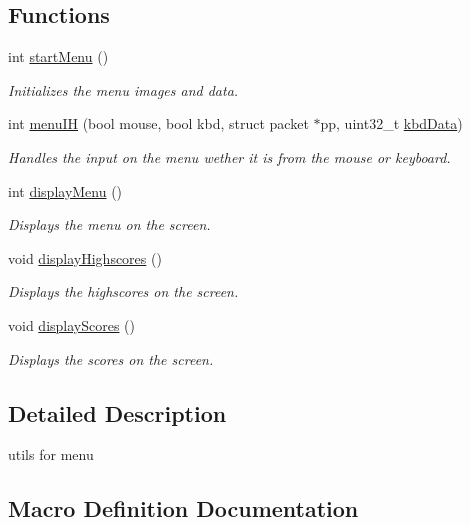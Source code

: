 \subsection*{Functions}
\begin{DoxyCompactItemize}
\item 
int \mbox{\hyperlink{group__menu_ga3bd019c071fe96105524873879e16c06}{start\+Menu}} ()
\begin{DoxyCompactList}\small\item\em Initializes the menu images and data. \end{DoxyCompactList}\item 
int \mbox{\hyperlink{group__menu_ga1c459dc7e822e8e658b11c66508d79f1}{menu\+IH}} (bool mouse, bool kbd, struct packet $\ast$pp, uint32\+\_\+t \mbox{\hyperlink{keyboard_8c_a6486f62fb206e8e9ca3ace0ba1e6efbf}{kbd\+Data}})
\begin{DoxyCompactList}\small\item\em Handles the input on the menu wether it is from the mouse or keyboard. \end{DoxyCompactList}\item 
int \mbox{\hyperlink{group__menu_gaad9ed7a055a99883645739e4bfca0e5e}{display\+Menu}} ()
\begin{DoxyCompactList}\small\item\em Displays the menu on the screen. \end{DoxyCompactList}\item 
void \mbox{\hyperlink{group__menu_ga69fa28cb0fa5f4165feb0612cd3ba98e}{display\+Highscores}} ()
\begin{DoxyCompactList}\small\item\em Displays the highscores on the screen. \end{DoxyCompactList}\item 
void \mbox{\hyperlink{group__menu_ga4e67dd36352ce9409d1994cad2553089}{display\+Scores}} ()
\begin{DoxyCompactList}\small\item\em Displays the scores on the screen. \end{DoxyCompactList}\end{DoxyCompactItemize}


\subsection{Detailed Description}
utils for menu 

\subsection{Macro Definition Documentation}
\mbox{\label{group__menu_ga5c2fee47b6e9a8dc63fee2efa67e6cdd}} 

